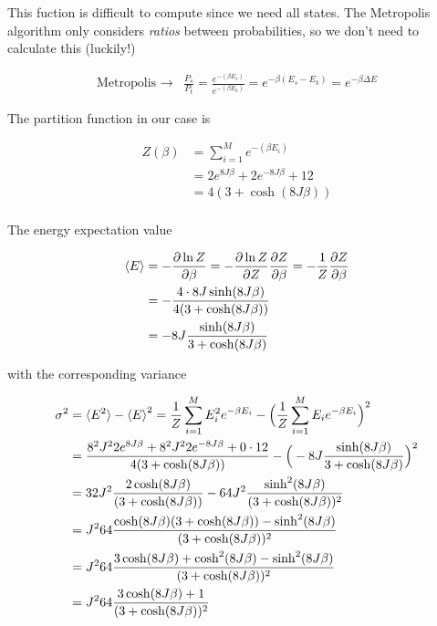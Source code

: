 \documentclass[11pt]{article}
\begin{document}
\begin{flushleft}

This fuction is difficult to compute since we need all states. The Metropolis algorithm only considers \textit{ratios} between probabilities, so we don't need to calculate this (luckily!)

\begin{align*}
\text{Metropolis } \rightarrow  &\frac{P_s}{P_t} = \frac{e^{-(\beta E_s)}}{e^{-(\beta E_k)}}
= e^{-\beta(E_s - E_k)}
= e^{-\beta \Delta E} 
\end{align*}


\end{flushleft}

\begin{flushleft}

The partition function in our case is

\begin{align*}
Z(\beta) &= \sum_{i=1}^M e^{-(\beta E_i)}\\
&= 2 e^{8J \beta} + 2 e^{-8J \beta} + 12\\
&= 4(3 + \cosh (8 J \beta))\\
\end{align*}


The energy expectation value

\begin{align*}
\braket{E} & = - \frac{\partial \ln Z}{\partial \beta}= - \frac{\partial \ln Z}{\partial Z} \frac{\partial Z}{\partial \beta} = - \frac{1}{Z} \frac{\partial Z}{\partial \beta}\\
& = - \frac{4 \cdot 8J \sinh(8J \beta)}{4(3 + \cosh (8 J \beta))}\\
&= - 8J \frac{\sinh(8J \beta)}{3 + \cosh(8J \beta)}  
\end{align*}

with the corresponding variance

\begin{align*}
\sigma^2 &= \braket{E^2} - \braket{E}^2 = \frac{1}{Z} \sum_{i=1}^M E_i^2 e^{- \beta E_i} - \Big(
\frac{1}{Z} \sum_{i=1}^M E_i e^{- \beta E_i} 
\Big)^2\\
 &= \frac{8^2 J^2  2 e^{8J \beta} + 8^2 J^2 2 e^{-8J \beta} + 0 \cdot 12}{ 4(3 + \cosh (8 J \beta))}
- \Big(  - 8J \frac{\sinh(8J \beta)}{3 + \cosh(8J \beta)}  \Big)^2\\
&= 32J^2 \frac{ 2 \cosh (8J \beta)}{ (3 + \cosh (8 J \beta))}
- 64 J^2 \frac{\sinh^2(8J \beta)}{(3 + \cosh(8J \beta))^2}\\
&= J^264 \frac{\cosh (8J \beta)(3 + \cosh (8 J \beta)) - \sinh^2(8J \beta)}{ (3 + \cosh (8 J \beta))^2}\\
&= J^264 \frac{
3\cosh (8J \beta) + \cosh^2 (8 J \beta)
 - \sinh^2(8J \beta)}{ (3 + \cosh (8 J \beta))^2}\\
 &= J^264 \frac{
3\cosh (8J \beta) + 1}{ (3 + \cosh (8 J \beta))^2}\\
\end{align*}


\end{flushleft}
\end{document}
